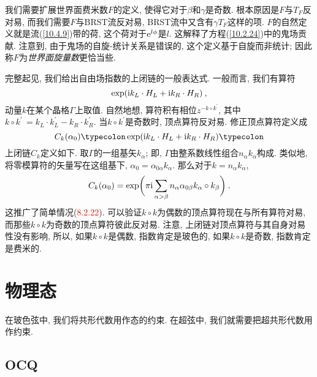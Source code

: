 我们需要扩展世界面费米数$ F $的定义, 使得它对于$ \beta $和$ \gamma $是奇数. 根本原因是$ F $与$ T_{F} $反对易, 而我们需要$ F $与BRST流反对易, BRST流中又含有$ \gamma T_{F} $这样的项. $F $的自然定义就是流(\ref{10.4.9})带的荷, 这个荷对于$ \mathrm{e}^{l\phi} $是$ l$. 这解释了方程(\ref{10.2.24})中的鬼场贡献. 注意到, 由于鬼场的自旋-统计关系是错误的, 这个定义基于自旋而非统计; 因此称$ F $为{\emph{世界面旋量数}}更恰当些.


完整起见, 我们给出自由场指数的上闭链的一般表达式. 一般而言, 我们有算符
\begin{equation}
    \exp(\mathrm{i} k_{L}\cdot H_{L} + \mathrm{i} k_{R}\cdot H_{R}) \:, \label{10.4.26}
\end{equation}
动量$ k $在某个晶格$ \Gamma $上取值. 自然地想, 算符积有相位$ z^{-k\circ k^{\prime}}$, 其中$ k\circ k^{\prime}\,=k_{L}\cdot k_{L}^{\prime} -k_{R}\cdot k_{R}^{\prime}$. 当$ k\circ k^{\prime} $是奇数时, 顶点算符反对易. 修正顶点算符定义成
\begin{equation}
    C_{k}(\alpha_{0}) \typecolon\exp(\mi k_{L}\cdot H_{L} + \mi k_{R}\cdot H_{R})\typecolon \label{10.4.27}
\end{equation}
上闭链$  C_{k} $定义如下. 取$ \Gamma $的一组基矢$ k_{\alpha}$; 即, $\Gamma $由整系数线性组合$ n_{\alpha}k_{\alpha} $构成. 类似地, 将零模算符的矢量写在这组基下, $\alpha_{0}=\alpha_{0\alpha}k_{\alpha}$. 那么对于$ k=n_{\alpha} k_{\alpha}$,
\begin{equation}
    C_{k}(\alpha_{0})=\exp \biggl( \pi\mathrm{i} \sum_{\alpha >\beta} 
    n_{\alpha}\alpha_{0\beta}k_{\alpha}\circ k_{\beta}\biggr) \:. \label{10.4.28} 
\end{equation}
这推广了简单情况(\textcolor{red}{8.2.22}). 可以验证$ k\circ k $为偶数的顶点算符现在与所有算符对易, 而那些$ k\circ k $为奇数的顶点算符彼此反对易. 注意, 上闭链对顶点算符与其自身对易性没有影响, 所以, 如果$ k\circ k $是偶数, 指数肯定是玻色的, 如果$ k\circ k $是奇数, 指数肯定是费米的.

\section{物理态}

在玻色弦中, 我们将共形代数用作态的约束. 在超弦中, 我们就需要把超共形代数用作约束.

\subsection*{OCQ}

